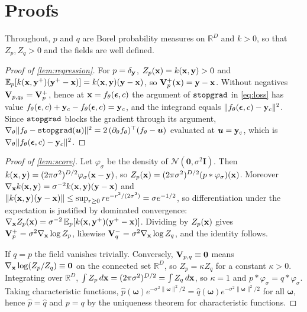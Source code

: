 \appendix
\section{Proofs}
\label{app:proofs}

Throughout, $p$ and $q$ are Borel probability measures on $\mathbb R^D$ and $k>0$, so that $Z_p,Z_q>0$ and the fields
are well defined.

\begin{proof}[Proof of \cref{lem:regression}]
For $p=\delta_{\mathbf{y}}$, $Z_p(\mathbf{x})=k(\mathbf{x},\mathbf{y})>0$ and $\mathbb E_p[k(\mathbf{x},\mathbf{y}^{+})(\mathbf{y}^{+}-\mathbf{x})]=k(\mathbf{x},\mathbf{y})(\mathbf{y}-\mathbf{x})$, so
$\mathbf{V}^{+}_{p}(\mathbf{x})=\mathbf{y}-\mathbf{x}$. Without negatives $\mathbf{V}_{p,q_\theta}=\mathbf{V}^{+}_{p}$, hence at $\mathbf{x}=f_\theta(\boldsymbol{\epsilon},c)$ the argument of $\text{\texttt{stopgrad}}$ in
\eqref{eq:loss} has value $f_\theta(\boldsymbol{\epsilon},c)+\mathbf{y}_c-f_\theta(\boldsymbol{\epsilon},c)=\mathbf{y}_c$, and the integrand equals
$\lVert f_\theta(\boldsymbol{\epsilon},c)-\mathbf{y}_c\rVert^2$. Since $\text{\texttt{stopgrad}}$ blocks the gradient through its argument,
$\nabla_\theta\lVert f_\theta-\text{\texttt{stopgrad}}(\boldsymbol u)\rVert^2=2\,(\partial_\theta f_\theta)^\top(f_\theta-\boldsymbol u)$
evaluated at $\boldsymbol u=\mathbf{y}_c$, which is $\nabla_\theta\lVert f_\theta(\boldsymbol{\epsilon},c)-\mathbf{y}_c\rVert^2$.
\end{proof}

\begin{proof}[Proof of \cref{lem:score}]
Let $\varphi_\sigma$ be the density of $\mathcal N(\mathbf 0,\sigma^2\mathbf I)$. Then
$k(\mathbf{x},\mathbf{y})=(2\pi\sigma^2)^{D/2}\varphi_\sigma(\mathbf{x}-\mathbf{y})$, so $Z_p(\mathbf{x})=(2\pi\sigma^2)^{D/2}(p*\varphi_\sigma)(\mathbf{x})$.
Moreover $\nabla_{\mathbf{x}}k(\mathbf{x},\mathbf{y})=\sigma^{-2}k(\mathbf{x},\mathbf{y})(\mathbf{y}-\mathbf{x})$ and
$\lVert k(\mathbf{x},\mathbf{y})(\mathbf{y}-\mathbf{x})\rVert\le\sup_{r\ge0}re^{-r^2/(2\sigma^2)}=\sigma e^{-1/2}$, so differentiation under the
expectation is justified by dominated convergence:
$\nabla_{\mathbf{x}}Z_p(\mathbf{x})=\sigma^{-2}\,\mathbb E_p[k(\mathbf{x},\mathbf{y}^{+})(\mathbf{y}^{+}-\mathbf{x})]$. Dividing by $Z_p(\mathbf{x})$ gives
$\mathbf{V}^{+}_{p}=\sigma^2\nabla_{\mathbf{x}}\log Z_p$, likewise $\mathbf{V}^{-}_{q}=\sigma^2\nabla_{\mathbf{x}}\log Z_q$, and the identity follows.

If $q=p$ the field vanishes trivially. Conversely, $\mathbf{V}_{p,q}\equiv\mathbf 0$ means
$\nabla_{\mathbf{x}}\log(Z_p/Z_q)\equiv\mathbf 0$ on the connected set $\mathbb R^D$, so $Z_p=\kappa Z_q$ for a constant
$\kappa>0$. Integrating over $\mathbb R^D$, $\int Z_p\,d\mathbf{x}=(2\pi\sigma^2)^{D/2}=\int Z_q\,d\mathbf{x}$, so $\kappa=1$ and
$p*\varphi_\sigma=q*\varphi_\sigma$. Taking characteristic functions,
$\hat p(\boldsymbol\omega)e^{-\sigma^2\lVert\boldsymbol\omega\rVert^2/2}=\hat q(\boldsymbol\omega)
e^{-\sigma^2\lVert\boldsymbol\omega\rVert^2/2}$ for all $\boldsymbol\omega$, hence $\hat p=\hat q$ and $p=q$ by the
uniqueness theorem for characteristic functions.
\end{proof}

